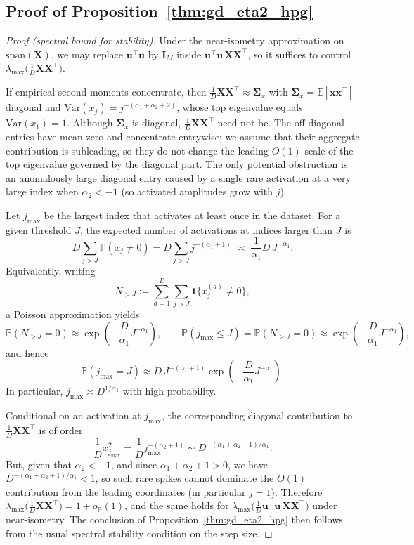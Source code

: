 \documentclass[11pt]{article}
\theoremstyle{plain}
\theoremstyle{definition}
\theoremstyle{remark}
\begin{document}
\subsection{Proof of Proposition~\ref{thm:gd_eta2_hpg}}\label{subsec:thm:gd_eta2_hpg}
\begin{proof}[Proof (spectral bound for stability)]
Under the near-isometry approximation on $\mathrm{span}(\mathbf{X})$, we may replace
$\mathbf{u}^\top\mathbf{u}$ by $\mathbf{I}_M$ inside $\mathbf{u}^\top\mathbf{u}\,\mathbf{X}\mathbf{X}^\top$,
so it suffices to control $\lambda_{\max}\!\big(\tfrac{1}{D}\mathbf{X}\mathbf{X}^\top\big)$.

If empirical second moments concentrate, then $\tfrac{1}{D}\mathbf{X}\mathbf{X}^\top\approx\boldsymbol{\Sigma}_x$
with $\boldsymbol{\Sigma}_x=\mathbb{E}[\mathbf{x}\mathbf{x}^\top]$ diagonal and
$\mathrm{Var}(x_j)=j^{-(\alpha_1+\alpha_2+2)}$, whose top eigenvalue equals $\mathrm{Var}(x_1)=1$. Although $\boldsymbol{\Sigma}_x$ is diagonal, $\tfrac{1}{D}\mathbf{X}\mathbf{X}^\top$ need not be. The off-diagonal entries have mean zero and concentrate entrywise; we assume that their aggregate contribution is subleading, so they do not change the leading $O(1)$ scale of the top eigenvalue governed by the diagonal part. The only potential obstruction is an anomalously large diagonal entry caused by a single rare activation at a very large index when $\alpha_2<-1$ (so activated amplitudes grow with $j$).

Let $j_{\max}$ be the largest index that activates at least once in the dataset.
For a given threshold $J$, the expected number of activations at indices larger than $J$ is
\[
D\sum_{j>J} \mathbb{P}(x_j\neq 0)
= D\sum_{j>J} j^{-(\alpha_1+1)}
\;\asymp\; \frac{1}{\alpha_1}D\,J^{-\alpha_1}.
\]
Equivalently, writing
\[
N_{>J}:=\sum_{d=1}^D\sum_{j>J}\mathbf{1}\{x^{(d)}_j\neq 0\},
\]
a Poisson approximation yields
\[
\mathbb{P}(N_{>J}=0)\approx\exp\!\left(-\frac{D}{\alpha_1}J^{-\alpha_1}\right),
\qquad
\mathbb{P}(j_{\max}\le J)=\mathbb{P}(N_{>J}=0)\approx\exp\!\left(-\frac{D}{\alpha_1}J^{-\alpha_1}\right),
\]
and hence
\[
\mathbb{P}(j_{\max}=J)\approx D\,J^{-(\alpha_1+1)}\exp\!\left(-\frac{D}{\alpha_1}J^{-\alpha_1}\right).
\]
In particular, $j_{\max}\asymp D^{1/\alpha_1}$ with high probability.

Conditional on an activation at $j_{\max}$, the corresponding diagonal contribution to
$\tfrac{1}{D}\mathbf{X}\mathbf{X}^\top$ is of order
\[
\frac{1}{D}x_{j_{\max}}^2
=\frac{1}{D}j_{\max}^{-(\alpha_2+1)}
\sim  D^{-(\alpha_1+\alpha_2+1)/\alpha_1}.
\]
But, given that $\alpha_2<-1$, and since $\alpha_1+\alpha_2+1>0$, we have $D^{-(\alpha_1+\alpha_2+1)/\alpha_1}<1$, so such rare spikes cannot dominate the
$O(1)$ contribution from the leading coordinates (in particular $j=1$). Therefore
$\lambda_{\max}\!\big(\tfrac{1}{D}\mathbf{X}\mathbf{X}^\top\big)=1+o_{\mathbb{P}}(1)$, and the same holds for
$\lambda_{\max}\!\big(\tfrac{1}{D}\mathbf{u}^\top\mathbf{u}\,\mathbf{X}\mathbf{X}^\top\big)$ under near-isometry.
The conclusion of Proposition~\ref{thm:gd_eta2_hpg} then follows from the usual spectral stability condition on the step size.
\end{proof}
\end{document}
